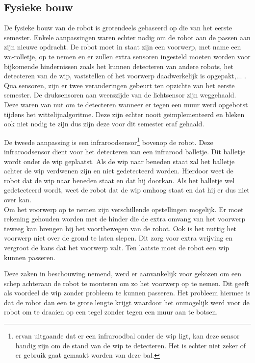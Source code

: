 \documentclass[tt1]{penoverslag}
\begin{document}
\subsection{Fysieke bouw}
\label{ssec:fysb}

De fysieke bouw van de robot is grotendeels gebaseerd op die van het eerste semester. Enkele aanpassingen waren echter nodig om de robot aan de passen aan zijn nieuwe opdracht. De robot moet in staat zijn een voorwerp, met name een wc-rolletje, op te nemen en er zullen extra sensoren ingesteld moeten worden voor bijkomende hindernissen zoals het kunnen detecteren van andere robots, het detecteren van de wip, vaststellen of het voorwerp daadwerkelijk is opgepakt,... .  
Qua sensoren, zijn er twee veranderingen gebeurt ten opzichte van het eerste semester. De druksensoren aan weerszijde van de lichtsensor zijn weggehaald. Deze waren van nut om te detecteren wanneer er tegen een muur werd opgebotst tijdens het wittelijnalgoritme. Deze zijn echter nooit geimplementeerd en bleken ook niet nodig te zijn dus zijn deze voor dit semester eraf gehaald. 

De tweede aanpassing is een infraroodsensor\footnote{ervan uitgaande dat er een infraroodbal onder de wip ligt, kan deze sensor handig zijn om de stand van de wip te detecteren. Het is echter niet zeker of er gebruik gaat gemaakt worden van deze bal.} bovenop de robot. Deze infraroodsensor dient voor het detecteren van een infrarood balletje. Dit balletje wordt onder de wip geplaatst. Als de wip naar beneden staat zal het balletje achter de wip verdwenen zijn en niet gedetecteerd worden. Hierdoor weet de robot dat de wip naar beneden staat en dat hij doorkan. Als het balletje wel gedetecteerd wordt, weet de robot dat de wip omhoog staat en dat hij er dus niet over kan. \\

Om het voorwerp op te nemen zijn verschillende opstellingen mogelijk. Er moet rekening gehouden worden met de hinder die de extra omvang van het voorwerp teweeg kan brengen bij het voortbewegen van de robot.
Ook is het nuttig het voorwerp niet over de grond te laten slepen. Dit zorg voor extra wrijving en vergroot de kans dat het voorwerp valt. Ten laatste moet de robot een wip kunnen passeren. 
 
Deze zaken in beschouwing nemend, werd er aanvankelijk voor gekozen om een schep achteraan de robot te monteren om zo het voorwerp op te nemen. Dit geeft als voordeel de wip zonder probleem te kunnen passeren. Het probleem hiermee is dat de robot dan een te grote lengte krijgt waardoor het onmogelijk werd voor de robot om te draaien op een tegel zonder tegen een muur aan te botsen. \\
\end{document}
